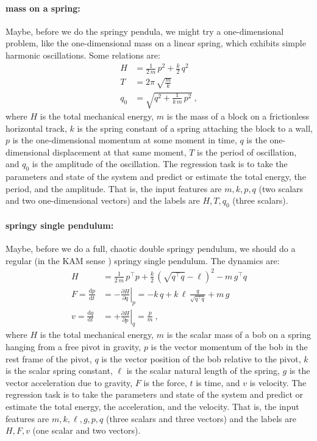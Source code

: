 \documentclass{article}
\newcommand{\dd}{\mathrm{d}}
\begin{document}
\paragraph{mass on a spring:} Maybe, before we do the springy pendula, we might try a one-dimensional problem, like the one-dimensional mass on a linear spring, which exhibits simple harmonic oscillations. Some relations are:
\begin{align}
    H &= \frac{1}{2\,m}\,p^2 + \frac{k}{2}\,q^2 \\
    T &= 2\pi\,\sqrt{\frac{m}{k}} \\
    q_0 &= \sqrt{q^2 + \frac{1}{k\,m}\,p^2} ~,
\end{align}
where $H$ is the total mechanical energy, $m$ is the mass of a block on a frictionless horizontal track, $k$ is the spring constant of a spring attaching the block to a wall, $p$ is the one-dimensional momentum at some moment in time, $q$ is the one-dimensional displacement at that same moment, $T$ is the period of oscillation, and $q_0$ is the amplitude of the oscillation.
The regression task is to take the parameters and state of the system and predict or estimate the total energy, the period, and the amplitude.
That is, the input features are $m,k,p,q$ (two scalars and two one-dimensional vectors) and the labels are $H,T,q_0$ (three scalars).

\paragraph{springy single pendulum:} Maybe, before we do a full, chaotic double springy pendulum, we should do a regular (in the KAM sense \cite{kam}) springy single pendulum. The dynamics are:
\begin{align}
    H &= \frac{1}{2\,m}\,p^\top p + \frac{k}{2}\,(\sqrt{q^\top q} - \ell)^2 - m\,g^\top q \\
    F = \frac{\dd p}{\dd t} &= -\left.\frac{\partial H}{\partial q}\right|_p = -k\,q + k\,\ell\,\frac{q}{\sqrt{q^\top q}} + m\,g \\
    v = \frac{\dd q}{\dd t} &= +\left.\frac{\partial H}{\partial p}\right|_q = \frac{p}{m} ~,
\end{align}
where $H$ is the total mechanical energy, $m$ is the scalar mass of a bob on a spring hanging from a free pivot in gravity, $p$ is the vector momentum of the bob in the rest frame of the pivot, $q$ is the vector position of the bob relative to the pivot, $k$ is the scalar spring constant, $\ell$ is the scalar natural length of the spring, $g$ is the vector acceleration due to gravity, $F$ is the force, $t$ is time, and $v$ is velocity.
The regression task is to take the parameters and state of the system and predict or estimate the total energy, the acceleration, and the velocity.
That is, the input features are $m,k,\ell,g,p,q$ (three scalars and three vectors) and the labels are $H,F,v$ (one scalar and two vectors).
\end{document}
